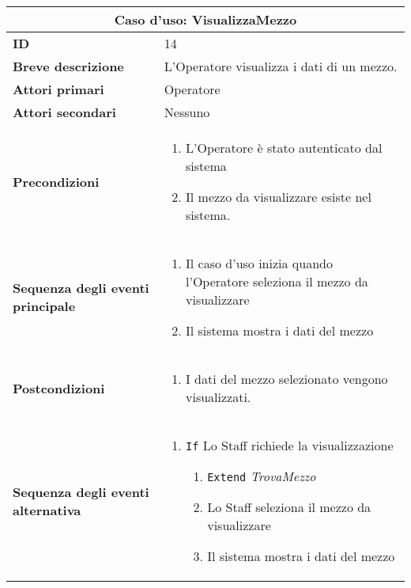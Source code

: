 \documentclass[a4paper]{report}
\begin{document}
\clearpage
\begin{table}[H]
\vspace*{-0cm}
\renewcommand{\arraystretch}{1.9}
\begin{tabular}{|p{3.9cm}|p{9.9cm}|}
\hline
\multicolumn{2}{|c|}{\textbf{Caso d’uso: VisualizzaMezzo}} \\ \hline
	\textbf{ID} & 14 \\ \hline
	\textbf{Breve descrizione} & L'Operatore visualizza i dati di un mezzo. \\ \hline
	\textbf{Attori primari} & Operatore \\ \hline
	\textbf{Attori secondari} & Nessuno \\ \hline
	\textbf{Precondizioni} & \begin{enumerate}[label=\arabic*.,leftmargin=14pt,labelsep=0.5em,topsep=0pt,partopsep=0pt,parsep=0pt,itemsep=0pt]
        \item L’Operatore è stato autenticato dal sistema
        \item Il mezzo da visualizzare esiste nel sistema.
    \end{enumerate} \\ \hline
    	\textbf{Sequenza degli eventi principale} & \begin{enumerate}[label=\arabic*.,leftmargin=14pt,labelsep=0.5em,topsep=0pt,partopsep=0pt,parsep=0pt,itemsep=0pt]
        \item Il caso d'uso inizia quando l'Operatore seleziona il mezzo da visualizzare
        \item Il sistema mostra i dati del mezzo 
    \end{enumerate}\\ \hline
    	\textbf{Postcondizioni} & \begin{enumerate}[label=\arabic*.,leftmargin=14pt,labelsep=0.5em,topsep=0pt,partopsep=0pt,parsep=0pt,itemsep=0pt]
        \item I dati del mezzo selezionato vengono visualizzati.
    \end{enumerate}\\ \hline
    	\textbf{Sequenza degli eventi alternativa} & \begin{enumerate}[leftmargin=14pt,label=\arabic*.,labelsep=0.5em,topsep=0pt,partopsep=0pt,parsep=0pt,itemsep=0pt]
        \item \texttt{If} Lo Staff richiede la visualizzazione
        \begin{enumerate}[label=\arabic{enumi}.\arabic*.,leftmargin=22pt,labelsep=0.5em,topsep=0pt,partopsep=0pt,parsep=0pt,itemsep=0pt]
            \item \texttt{Extend} \textit{TrovaMezzo}
            \item Lo Staff seleziona il mezzo da visualizzare
            \item Il sistema mostra i dati del mezzo 
        \end{enumerate}
    \end{enumerate} \\ \hline
\end{tabular}
\end{table}
\end{document}
